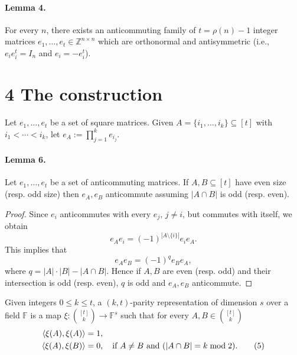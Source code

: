 \documentclass[10pt,a4paper]{article}
\begin{document}
\paragraph{Lemma 4.} For every $n$, there exists an anticommuting family of $t=\rho(n)-1$ integer matrices $e_1,\ldots,e_t\in\mathbb Z^{n\times n}$ which are orthonormal and antisymmetric (i.e., $e_ie_i^t=I_n$ and $e_i=-e_i^t$).
\section*{4 The construction}
Let $e_1,\ldots,e_t$ be a set of square matrices. Given $A=\{i_1,\ldots,i_k\}\subseteq[t]$ with $i_1<\cdots<i_k$, let $e_A:=\prod_{j=1}^k e_{i_j}$.
\paragraph{Lemma 6.} Let $e_1,\ldots,e_t$ be a set of anticommuting matrices. If $A,B\subseteq[t]$ have even size (resp. odd size) then $e_A,e_B$ anticommute assuming $|A\cap B|$ is odd (resp. even).
\begin{proof}
Since $e_i$ anticommutes with every $e_j$, $j\ne i$, but commutes with itself, we obtain
\[e_Ae_i=(-1)^{|A\setminus\{i\}|}e_i e_A.\]
This implies that
\[e_Ae_B=(-1)^q e_Be_A,\]
where $q=|A|\cdot|B|-|A\cap B|$. Hence if $A,B$ are even (resp. odd) and their intersection is odd (resp. even), $q$ is odd and $e_A,e_B$ anticommute.
\end{proof}
Given integers $0\le k\le t$, a $(k,t)$-parity representation of dimension $s$ over a field $\mathbb F$ is a map $\xi:\binom{[t]}k\to\mathbb F^s$ such that for every $A,B\in\binom{[t]}k$
\begin{align}
\langle\xi(A),\xi(A)\rangle&=1,\notag\\
\langle\xi(A),\xi(B)\rangle&=0,\quad\text{if }A\ne B\text{ and }(|A\cap B|=k\bmod2).\tag{5}
\end{align}
\end{document}
